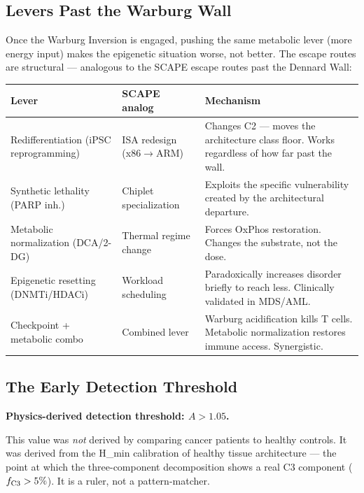 \documentclass[12pt,a4paper]{article}
\begin{document}
\subsection{Levers Past the Warburg Wall}
\label{subsec:levers}

Once the Warburg Inversion is engaged, pushing the same metabolic lever
(more energy input) makes the epigenetic situation worse, not better.
The escape routes are structural --- analogous to the SCAPE escape routes
past the Dennard Wall:

\begin{center}
\renewcommand{\arraystretch}{1.25}
\begin{tabular}{p{3.0cm}p{3.0cm}p{5.5cm}}
\toprule
\textbf{Lever} & \textbf{SCAPE analog} & \textbf{Mechanism} \\
\midrule
Redifferentiation (iPSC reprogramming) & ISA redesign (x86$\to$ARM) & Changes C2 --- moves the architecture class floor. Works regardless of how far past the wall. \\
Synthetic lethality (PARP inh.) & Chiplet specialization & Exploits the specific vulnerability created by the architectural departure. \\
Metabolic normalization (DCA/2-DG) & Thermal regime change & Forces OxPhos restoration. Changes the substrate, not the dose. \\
Epigenetic resetting (DNMTi/HDACi) & Workload scheduling & Paradoxically increases disorder briefly to reach less. Clinically validated in MDS/AML. \\
Checkpoint + metabolic combo & Combined lever & Warburg acidification kills T cells. Metabolic normalization restores immune access. Synergistic. \\
\bottomrule
\end{tabular}
\end{center}

\subsection{The Early Detection Threshold}
\label{subsec:early_det}

\begin{keybox}
\textbf{Physics-derived detection threshold: $A > 1.05$.}

This value was \emph{not} derived by comparing cancer patients to healthy controls.
It was derived from the H\_min calibration of healthy tissue architecture ---
the point at which the three-component decomposition shows a real C3 component
($f_{\rm C3} > 5\%$).
It is a ruler, not a pattern-matcher.
\end{keybox}
\end{document}
